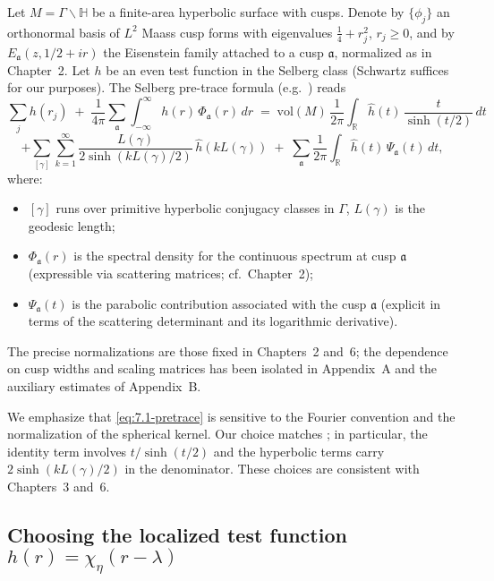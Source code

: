 Let $M=\Gamma\backslash\mathbb{H}$ be a finite-area hyperbolic surface with cusps. Denote by $\{\phi_j\}$ an orthonormal basis of $L^2$ Maass cusp forms with eigenvalues $\frac14 + r_j^2$, $r_j\ge 0$, and by $E_{\mathfrak{a}}(z,1/2+ir)$ the Eisenstein family attached to a cusp $\mathfrak{a}$, normalized as in Chapter~2. Let $h$ be an even test function in the Selberg class (Schwartz suffices for our purposes). The Selberg pre-trace formula (e.g.\ \cite{Hejhal1983, Selberg1956}) reads
\begin{equation}\label{eq:7.1-pretrace}
  \sum_{j} h(r_j)
  \;+\; \frac{1}{4\pi}\sum_{\mathfrak{a}}\int_{-\infty}^{\infty}
      h(r)\, \Phi_{\mathfrak{a}}(r)\, dr
  \;=\; \mathrm{vol}(M)\,\frac{1}{2\pi}\int_{\mathbb{R}} \widehat{h}(t)\,\frac{t}{\sinh(t/2)}\, dt
\end{equation}
\[
  + \sum_{[\gamma]}\sum_{k=1}^{\infty}
      \frac{L(\gamma)}{2\sinh(k L(\gamma)/2)}\,
      \widehat{h}(k L(\gamma))
  \;+\; \sum_{\mathfrak{a}} \frac{1}{2\pi}\int_{\mathbb{R}}
      \widehat{h}(t)\, \Psi_{\mathfrak{a}}(t)\, dt,
\]
where:
\begin{itemize}
  \item $[\gamma]$ runs over primitive hyperbolic conjugacy classes in $\Gamma$, $L(\gamma)$ is the geodesic length;
  \item $\Phi_{\mathfrak{a}}(r)$ is the spectral density for the continuous spectrum at cusp $\mathfrak{a}$ (expressible via scattering matrices; cf.\ Chapter~2);
  \item $\Psi_{\mathfrak{a}}(t)$ is the parabolic contribution associated with the cusp $\mathfrak{a}$ (explicit in terms of the scattering determinant and its logarithmic derivative).
\end{itemize}
The precise normalizations are those fixed in Chapters~2 and~6; the dependence on cusp widths and scaling matrices has been isolated in Appendix~A and the auxiliary estimates of Appendix~B.

\begin{remark}[On normalizations]\label{rmk:7.1-normalizations}
We emphasize that \eqref{eq:7.1-pretrace} is sensitive to the Fourier convention and the normalization of the spherical kernel. Our choice matches \cite[Ch.~3]{Iwaniec2002}; in particular, the identity term involves $t/\sinh(t/2)$ and the hyperbolic terms carry $2\sinh(kL(\gamma)/2)$ in the denominator. These choices are consistent with Chapters~3 and~6.
\end{remark}

\subsection{Choosing the localized test function $h(r)=\chi_\eta(r-\lambda)$} \label{subsec:7.1-local-h}

